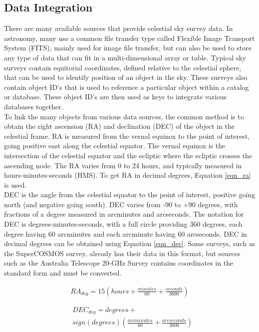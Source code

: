 \documentclass[11pt,sigconf]{acmart}
\begin{document}
\subsection{Data Integration}
There are many available sources that provide celestial sky survey data. In astronomy,
many use a common file transfer type called Flexible Image Transport System (FITS), 
mainly used for image file transfer, but can also be used to store any type of data 
that can fit in a multi-dimensional array or table. Typical sky surveys contain 
equitorial coordinates, defined relative to the celestial sphere, that can be used to 
identify position of an object in the sky. These surveys also contain object ID's that 
is used to reference a particular object within a catalog or database. These object 
ID's are then used as keys to integrate various databases together. 
\\
To link the many objects from various data sources, the common method is to obtain
the right ascension (RA) and declination (DEC) of the object in the celestial frame. 
RA is measured from the vernal equinox to the point of interest, going positive east
along the celestial equator. The vernal equinox is the intersection of the celestial 
equator and the ecliptic where the ecliptic crosses the ascending node. The RA varies 
from 0 to 24 hours, and typically measured in hours-minutes-seconds (HMS). To get RA 
in decimal degrees, Equation \ref{eqn_ra} is used. 
\\
DEC is the angle from the celestial equator to the point of interest, positive going 
north (and negative going south). DEC varies from -90 to +90 degrees, with fractions 
of a degree measured in arcminutes and arcseconds. The notation for DEC is 
degrees-minutes-seconds, with a full circle providing 360 degrees, each degree having 
60 arcminutes and each arcminute having 60 arcseconds. DEC in decimal degrees can be 
obtained using Equation \ref{eqn_dec}. Some surveys, such as the SuperCOSMOS survey, 
already has their data in this format, but sources such as the Australia Telescope 
20-GHz Survey contains coordinates in the standard form and must be converted.

\begin{equation} \label{eqn_ra}
  \begin{split}
    RA_{deg}= 15(hours + \frac{minutes}{60} + \frac{seconds}{3600}) 
  \end{split}
\end{equation}

\begin{equation} \label{eqn_dec}
  \begin{split}
  & DEC_{deg}= degrees+ \\
  & sign(degrees)(\frac{arcminutes}{60} + \frac{arcseconds}{3600})
  \end{split}
\end{equation}
\end{document}
